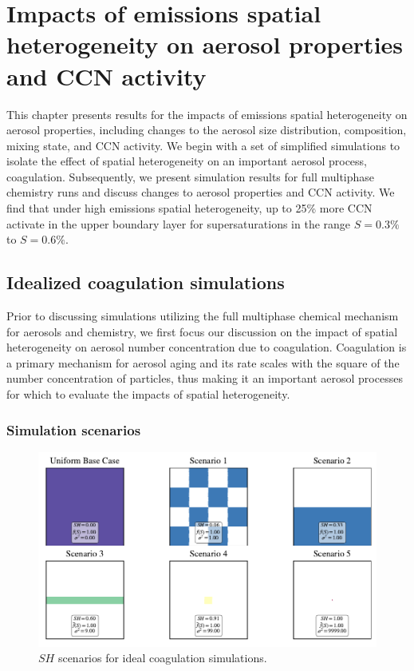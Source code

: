 \chapter{Impacts of emissions spatial heterogeneity on aerosol properties and CCN activity}

This chapter presents results for the impacts of emissions spatial heterogeneity on aerosol properties, including changes to the aerosol size distribution, composition, mixing state, and CCN activity. We begin with a set of simplified simulations to isolate the effect of spatial heterogeneity on an important aerosol process, coagulation. Subsequently, we present simulation results for full multiphase chemistry runs and discuss changes to aerosol properties and CCN activity. We find that under high emissions spatial heterogeneity, up to 25\% more CCN activate in the upper boundary layer for supersaturations in the range $S=0.3\%$ to $S=0.6\%$. 
\section{Idealized coagulation simulations}

Prior to discussing simulations utilizing the full multiphase chemical mechanism for aerosols and chemistry, we first focus our discussion on the impact of spatial heterogeneity on aerosol number concentration due to coagulation. Coagulation is a primary mechanism for aerosol aging and its rate scales with the square of the number concentration of particles, thus making it an important aerosol processes for which to evaluate the impacts of spatial heterogeneity. 

\subsection{Simulation scenarios}

\begin{figure}[h]
  \centering
    \includegraphics[width=\textwidth]{figures/chapter5/ideal-coag/ideal-coag-SH-scenarios.pdf}
    \caption{$SH$ scenarios for ideal coagulation simulations.}
    \label{fig:sh-scenarios-ideal-coag}
\end{figure}

